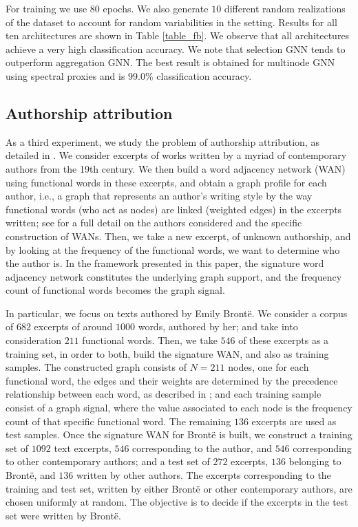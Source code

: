 For training we use $80$ epochs. We also generate $10$ different random realizations of the dataset to account for random variabilities in the setting. Results for all ten architectures are shown in Table \ref{table_fb}. We observe that all architectures achieve a very high classification accuracy. We note that selection GNN tends to outperform aggregation GNN. The best result is obtained for multinode GNN using spectral proxies and is $99.0\%$ classification accuracy.


\subsection{Authorship attribution} \label{subsec_author}

As a third experiment, we study the problem of authorship attribution, as detailed in \cite{segarra15-wans}. We consider excerpts of works written by a myriad of contemporary authors from the 19th century. We then build a word adjacency network (WAN) using functional words in these excerpts, and obtain a graph profile for each author, i.e., a graph that represents an author's writing style by the way functional words (who act as nodes) are linked (weighted edges) in the excerpts written; see \cite{segarra15-wans} for a full detail on the authors considered and the specific construction of WANs. Then, we take a new excerpt, of unknown authorship, and by looking at the frequency of the functional words, we want to determine who the author is. In the framework presented in this paper, the signature word adjacency network constitutes the underlying graph support, and the frequency count of functional words becomes the graph signal.

In particular, we focus on texts authored by Emily Bront{\"{e}}. We consider a corpus of $682$ excerpts of around $1000$ words, authored by her; and take into consideration $211$ functional words. Then, we take $546$ of these excerpts as a training set, in order to both, build the signature WAN, and also as training samples. The constructed graph consists of $N=211$ nodes, one for each functional word, the edges and their weights are determined by the precedence relationship between each word, as described in \cite{segarra15-wans}; and each training sample consist of a graph signal, where the value associated to each node is the frequency count of that specific functional word. The remaining $136$ excerpts are used as test samples. Once the signature WAN for Bront\"{e} is built, we construct a training set of $1092$ text excerpts, $546$ corresponding to the author, and $546$ corresponding to other contemporary authors; and a test set of $272$ excerpts, $136$ belonging to Bront\"{e}, and $136$ written by other authors. The excerpts corresponding to the training and test set, written by either Bront\"{e} or other contemporary authors, are chosen uniformly at random. The objective is to decide if the excerpts in the test set were written by Bront\"{e}.


